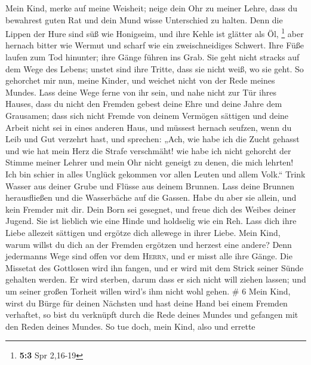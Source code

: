  Mein Kind, merke auf meine Weisheit; neige dein Ohr zu
meiner Lehre,  dass du bewahrest guten Rat und dein Mund
wisse Unterschied zu halten.  Denn die Lippen der Hure
sind süß wie Honigseim, und ihre Kehle ist glätter als Öl, \footnote{\textbf{5:3}
  Spr 2,16-19}  aber hernach bitter wie Wermut und scharf
wie ein zweischneidiges Schwert.  Ihre Füße laufen zum Tod
hinunter; ihre Gänge führen ins Grab.  Sie geht nicht
stracks auf dem Wege des Lebens; unstet sind ihre Tritte, dass sie nicht
weiß, wo sie geht.  So gehorchet mir nun, meine Kinder,
und weichet nicht von der Rede meines Mundes.  Lass deine
Wege ferne von ihr sein, und nahe nicht zur Tür ihres Hauses,
 dass du nicht den Fremden gebest deine Ehre und deine
Jahre dem Grausamen;  dass sich nicht Fremde von deinem
Vermögen sättigen und deine Arbeit nicht sei in eines anderen Haus,
 und müssest hernach seufzen, wenn du Leib und Gut
verzehrt hast,  und sprechen: „Ach, wie habe ich die
Zucht gehasst und wie hat mein Herz die Strafe verschmäht!
 wie habe ich nicht gehorcht der Stimme meiner Lehrer und
mein Ohr nicht geneigt zu denen, die mich lehrten!  Ich
bin schier in alles Unglück gekommen vor allen Leuten und allem Volk.``
 Trink Wasser aus deiner Grube und Flüsse aus deinem
Brunnen.  Lass deine Brunnen herausfließen und die
Wasserbäche auf die Gassen.  Habe du aber sie allein, und
kein Fremder mit dir.  Dein Born sei gesegnet, und freue
dich des Weibes deiner Jugend.  Sie ist lieblich wie eine
Hinde und holdselig wie ein Reh. Lass dich ihre Liebe allezeit sättigen
und ergötze dich allewege in ihrer Liebe.  Mein Kind,
warum willst du dich an der Fremden ergötzen und herzest eine andere?
 Denn jedermanns Wege sind offen vor dem \textsc{Herrn},
und er misst alle ihre Gänge.  Die Missetat des Gottlosen
wird ihn fangen, und er wird mit dem Strick seiner Sünde gehalten
werden.  Er wird sterben, darum dass er sich nicht will
ziehen lassen; und um seiner großen Torheit willen wird's ihm nicht wohl
gehen. \# 6  Mein Kind, wirst du Bürge für deinen Nächsten
und hast deine Hand bei einem Fremden verhaftet,  so bist
du verknüpft durch die Rede deines Mundes und gefangen mit den Reden
deines Mundes.  So tue doch, mein Kind, also und errette
